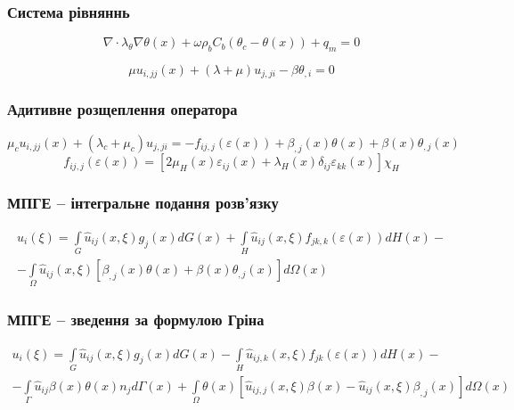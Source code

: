\documentclass{beamer}
\begin{document}
\begin{frame}
    \frametitle{Система рівняннь}
    \begin{equation*}
        \label{eqn:theory_thermo_pennes_eqn}
        \nabla \cdot \lambda_\theta \nabla \theta(x) + \omega \rho_b C_b (\theta_c - \theta(x)) + q_m  = 0
    \end{equation*}

    \begin{equation}
        \label{eqn:theory_thermoelasticity_displacement_eqn}
        \mu u_{i,jj}(x) + (\lambda + \mu)u_{j,ji} - \beta \theta_{,i} = 0
    \end{equation}
\end{frame}

\begin{frame}
    \frametitle{Адитивне розщеплення оператора}
    \begin{equation*}
        \mu_c u_{i,jj}(x) + (\lambda_c + \mu_c)u_{j,ji} = -f_{ij,j}(\varepsilon(x)) + \beta_{,j}(x) \theta(x) +
        \beta(x) \theta_{,j}(x)
    \end{equation*}
    \begin{equation*}
        f_{ij,j}(\varepsilon(x)) = [ 2\mu_H(x)\varepsilon_{ij}(x) + \lambda_H(x) \delta_{ij} \varepsilon_{kk}(x) ]
        \chi_H
    \end{equation*}
\end{frame}

\begin{frame}
    \frametitle{МПГЕ -- інтегральне подання розв'язку}
    \begin{equation*}
        \begin{split}
            u_i(\xi) = \int \limits_G \hat{u}_{ij}(x,\xi) g_j(x)d G(x)
            + \int \limits_H \hat{u}_{ij}(x,\xi)f_{jk,k}(\varepsilon(x))d H(x) - \\
            - \int \limits_{\Omega} \hat{u}_{ij}(x, \xi) [\beta_{,j}(x) \theta(x) + \beta(x) \theta_{,j}(x)]d\Omega(x)
        \end{split}
    \end{equation*}
\end{frame}

\begin{frame}
    \frametitle{МПГЕ -- зведення за формулою Гріна}
    \begin{equation*}
        \begin{split}
            u_i(\xi) = \int \limits_G \hat{u}_{ij}(x,\xi) g_j(x)d G(x)
            - \int \limits_H \hat{u}_{ij,k}(x,\xi)f_{jk}(\varepsilon(x))d H(x) - \\
            - \int \limits_{\Gamma} \hat{u}_{ij} \beta(x) \theta (x) n_j d \Gamma(x)
            + \int \limits_{\Omega} \theta(x)
            [\hat{u}_{ij,j}(x,\xi)\beta(x)-\hat{u}_{ij}(x,\xi)\beta_{,j}(x)]d\Omega(x)
        \end{split}
    \end{equation*}
\end{frame}
\end{document}
